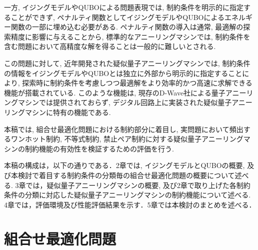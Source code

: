 \documentclass[submit,techrep,noauthor]{ipsj}
\begin{document}
一方, イジングモデルやQUBOによる問題表現では, 制約条件を明示的に指定することができず, ペナルティ関数としてイジングモデルやQUBOによるエネルギー関数の一部に埋め込む必要がある. ペナルティ関数の導入は通常, 最適解の探索精度に影響に与えることから, 標準的なアニーリングマシンでは, 制約条件を含む問題において高精度な解を得ることは一般的に難しいとされる\cite{ozeki}.

この問題に対して, 近年開発された疑似量子アニーリングマシンでは, 制約条件の情報をイジングモデルやQUBOとは独立に外部から明示的に指定することにより, 探索時に制約条件を考慮しつつ最適解をより効率的かつ高速に求解できる機能が搭載されている\cite{takano, da3}. このような機能は, 現存のD-Wave社による量子アニーリングマシンでは提供されておらず, デジタル回路上に実装された疑似量子アニーリングマシンに特有の機能である. 

本稿では, 組合せ最適化問題における制約部分に着目し, 実問題において頻出するワンホット制約, 不等式制約, 禁止ペア制約に対する疑似量子アニーリングマシンの制約機能の有効性を検証するための評価を行う.

本稿の構成は，以下の通りである．2章では, イジングモデルとQUBOの概要, 及び本検討で着目する制約条件の分類毎の組合せ最適化問題の概要について述べる. 3章では，疑似量子アニーリングマシンの概要, 及び2章で取り上げた各制約条件の分類に対応した疑似量子アニーリングマシンの制約機能について述べる. 4章では，評価環境及び性能評価結果を示す．5章では本検討のまとめを述べる．

\section{組合せ最適化問題}

\end{document}
